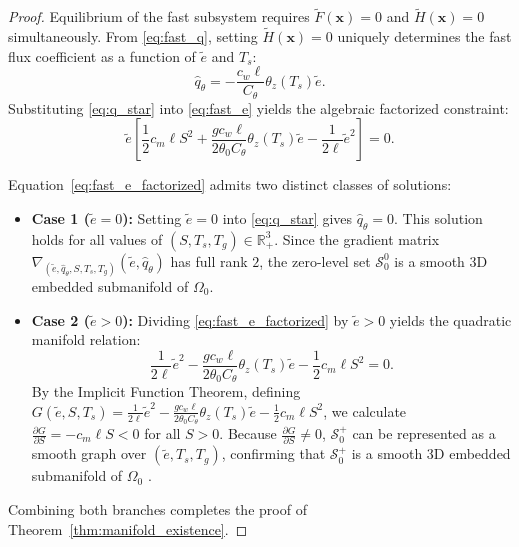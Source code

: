 \begin{proof}
Equilibrium of the fast subsystem requires $\tilde F(\mathbf{x}) = 0$ and $\tilde H(\mathbf{x}) = 0$ simultaneously. From \eqref{eq:fast_q}, setting $\tilde H(\mathbf{x}) = 0$ uniquely determines the fast flux coefficient as a function of $\tilde e$ and $T_s$:
\begin{equation}
\hat q_\theta = -\frac{c_w \ell}{C_\theta} \theta_z(T_s) \tilde e.
\label{eq:q_star}
\end{equation}
Substituting \eqref{eq:q_star} into \eqref{eq:fast_e} yields the algebraic factorized constraint:
\begin{equation}
\tilde e \left[ \frac{1}{2} c_m \ell S^2 + \frac{g c_w \ell}{2\theta_0 C_\theta} \theta_z(T_s) \tilde e - \frac{1}{2\ell} \tilde e^2 \right] = 0.
\label{eq:fast_e_factorized}
\end{equation}

Equation~\eqref{eq:fast_e_factorized} admits two distinct classes of solutions:
\begin{itemize}
    \item \textbf{Case 1 ($\tilde e = 0$):} Setting $\tilde e = 0$ into \eqref{eq:q_star} gives $\hat q_\theta = 0$. This solution holds for all values of $(S, T_s, T_g) \in \mathbb{R}_+^3$. Since the gradient matrix $\nabla_{(\tilde e, \hat q_\theta, S, T_s, T_g)} (\tilde e, \hat q_\theta)$ has full rank $2$, the zero-level set $\mathcal{S}_0^0$ is a smooth 3D embedded submanifold of $\Omega_0$.

    \item \textbf{Case 2 ($\tilde e > 0$):} Dividing \eqref{eq:fast_e_factorized} by $\tilde e > 0$ yields the quadratic manifold relation:
    \begin{equation}
    \frac{1}{2\ell} \tilde e^2 - \frac{g c_w \ell}{2\theta_0 C_\theta} \theta_z(T_s) \tilde e - \frac{1}{2} c_m \ell S^2 = 0.
    \label{eq:quadratic_e}
    \end{equation}
    By the Implicit Function Theorem, defining $G(\tilde e, S, T_s) = \frac{1}{2\ell} \tilde e^2 - \frac{g c_w \ell}{2\theta_0 C_\theta} \theta_z(T_s) \tilde e - \frac{1}{2} c_m \ell S^2$, we calculate $\frac{\partial G}{\partial S} = -c_m \ell S < 0$ for all $S > 0$. Because $\frac{\partial G}{\partial S} \neq 0$, $\mathcal{S}_0^+$ can be represented as a smooth graph over $(\tilde e, T_s, T_g)$, confirming that $\mathcal{S}_0^+$ is a smooth 3D embedded submanifold of $\Omega_0$ \citep{Kuehn2015}.
\end{itemize}
Combining both branches completes the proof of Theorem~\ref{thm:manifold_existence}.
\end{proof}

